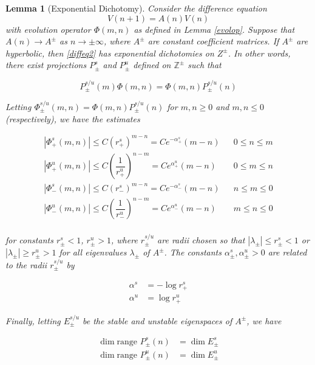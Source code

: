 \documentclass[12pt]{article}
\def\Z{{\mathbb Z}}
\newtheorem{lemma}{Lemma}
\begin{document}
\begin{lemma}[Exponential Dichotomy]\label{dichotomy}
Consider the difference equation
\begin{equation}\label{diffeq3}
V(n+1) = A(n) V(n)
\end{equation}
with evolution operator $\Phi(m, n)$ as defined in Lemma \ref{evolop}. Suppose that $A(n) \rightarrow A^\pm$ as $n \rightarrow \pm \infty$, where $A^\pm$ are constant coefficient matrices. If $A^\pm$ are hyperbolic, then \eqref{diffeq2} has exponential dichotomies on $Z^\pm$. In other words, there exist projections $P_\pm^s$ and $P_\pm^u$ defined on $\Z^\pm$ such that

\begin{equation}\label{projcommute}
P_\pm^{s/u}(m) \Phi(m, n) =  \Phi(m, n) P_\pm^{s/u}(n)
\end{equation}

Letting $\Phi_\pm^{s/u}(m, n) = \Phi(m, n) P_\pm^{s/u}(n)$ for $m, n \geq 0$ and $m, n \leq 0$ (respectively), we have the estimates

\begin{align*}
|\Phi_+^s(m, n)| \leq C (r_+^s)^{m - n} = C e^{-\alpha_+^s}(m - n) && 0 \leq n \leq m \\
|\Phi_+^u(m, n)| \leq C \left( \dfrac{1}{r_+^u} \right)^{n-m} = C e^{\alpha_+^u}(m - n) && 0 \leq m \leq n \\
|\Phi_-^s(m, n)| \leq C (r_-^s)^{m - n} = C e^{-\alpha_-^s}(m - n) && n \leq m \leq 0 \\
|\Phi_-^u(m, n)| \leq C \left( \dfrac{1}{r_-^u} \right)^{n-m} = C e^{\alpha_-^u}(m - n) && m \leq n \leq 0\\
\end{align*}

for constants $r_\pm^s < 1$, $r_\pm^u > 1$, where $r_\pm^{s/u}$ are radii chosen so that $|\lambda_\pm| \leq r_\pm^s < 1$ or $|\lambda_\pm| \geq r_\pm^u > 1$ for all eigenvalues $\lambda_\pm$ of $A^\pm$. The constants $\alpha_\pm^s, \alpha_\pm^u > 0$ are related to the radii $r_\pm^{s/u}$ by

\begin{align*}
\alpha^s &= -\log r_+^s\\
\alpha^u &= \log r_+^u
\end{align*}
 
Finally, letting $E_\pm^{s/u}$ be the stable and unstable eigenspaces of $A^\pm$, we have

\begin{align*}
\dim \text{range }P_\pm^s(n) &= \dim E_\pm^s \\
\dim \text{range }P_\pm^u(n) &= \dim E_\pm^u
\end{align*}


\end{lemma}
\end{document}
